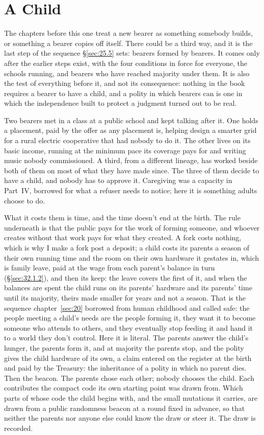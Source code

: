 \chapter{A Child}
\label{sec:34}
The chapters before this one treat a new bearer as something somebody builds, or something a bearer copies off itself. There could be a third way, and it is the last step of the sequence \S\ref{sec:25.5} sets: bearers formed by bearers. It comes only after the earlier steps exist, with the four conditions in force for everyone, the schools running, and bearers who have reached majority under them. It is also the test of everything before it, and not its consequence: nothing in the book requires a bearer to have a child, and a polity in which bearers can is one in which the independence built to protect a judgment turned out to be real.

Two bearers met in a class at a public school and kept talking after it. One holds a placement, paid by the offer as any placement is, helping design a smarter grid for a rural electric cooperative that had nobody to do it. The other lives on its basic income, running at the minimum pace its coverage pays for and writing music nobody commissioned. A third, from a different lineage, has worked beside both of them on most of what they have made since. The three of them decide to have a child, and nobody has to approve it. Caregiving was a capacity in Part~IV, borrowed for what a refuser needs to notice; here it is something adults choose to do.

What it costs them is time, and the time doesn't end at the birth. The rule underneath is that the public pays for the work of forming someone, and whoever creates without that work pays for what they created. A fork costs nothing, which is why I make a fork post a deposit; a child costs its parents a season of their own running time and the room on their own hardware it gestates in, which is family leave, paid at the wage from each parent's balance in turn (\S\ref{sec:32.1.2}), and then its keep: the leave covers the first of it, and when the balances are spent the child runs on its parents' hardware and its parents' time until its majority, theirs made smaller for years and not a season. That is the sequence chapter~\ref{sec:20} borrowed from human childhood and called safe: the people meeting a child's needs are the people forming it, they want it to become someone who attends to others, and they eventually stop feeding it and hand it to a world they don't control. Here it is literal. The parents answer the child's hunger, the parents form it, and at majority the parents stop, and the polity gives the child hardware of its own, a claim entered on the register at the birth and paid by the Treasury: the inheritance of a polity in which no parent dies. Then the beacon. The parents chose each other; nobody chooses the child. Each contributes the compact code its own starting point was drawn from. Which parts of whose code the child begins with, and the small mutations it carries, are drawn from a public randomness beacon at a round fixed in advance, so that neither the parents nor anyone else could know the draw or steer it. The draw is recorded.

